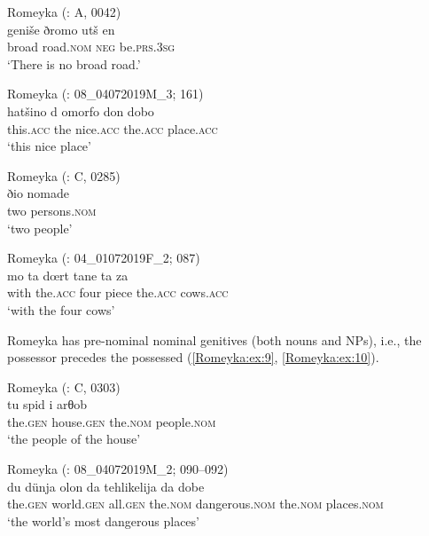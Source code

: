 \documentclass[output=paper,colorlinks,citecolor=brown]{langscibook}
\begin{document}
\ea\label{Romeyka:ex:5}
Romeyka (\citealt{schreiber2021pontic}: A, 0042) \\
\gll geniše ðromo utš en \\
broad road\textsc{.nom} \textsc{neg} be\textsc{.prs.3sg} \\
\glt `There is no broad road.'
\z

\ea\label{Romeyka:ex:6}
Romeyka (\citealt{schreiber_inprep}: 08\_04072019M\_3; 161) \\
\gll hatšino d omorfo don dobo \\
this\textsc{.acc} the nice\textsc{.acc} the\textsc{.acc} place\textsc{.acc} \\
\glt `this nice place'  \\
\z

\ea\label{Romeyka:ex:7}
Romeyka (\citealt{schreiber2021pontic}: C, 0285) \\
\gll ðio nomade  \\
two persons\textsc{.nom} \\
\glt `two people'  \\
\z

\ea\label{Romeyka:ex:8}
Romeyka (\citealt{schreiber_inprep}: 04\_01072019F\_2; 087) \\
\gll mo ta dœrt tane ta za \\
with the\textsc{.acc} four piece the\textsc{.acc} cows\textsc{.acc} \\
\glt `with the four cows'  \\
\z

Romeyka has pre-nominal nominal genitives (both nouns and NPs), i.e., the possessor precedes the possessed (\ref{Romeyka:ex:9}, \ref{Romeyka:ex:10}).

\ea\label{Romeyka:ex:9}
Romeyka (\citealt{schreiber2021pontic}: C, 0303) \\
\gll tu spid i arθob \\
the\textsc{.gen} house\textsc{.gen} the\textsc{.nom} people\textsc{.nom} \\
\glt `the people of the house'  \\
\z

\ea\label{Romeyka:ex:10}
Romeyka (\citealt{schreiber_inprep}: 08\_04072019M\_2; 090--092) \\
\gll du dünja olon da tehlikelija da dobe  \\
the\textsc{.gen} world\textsc{.gen} all\textsc{.gen} the\textsc{.nom} dangerous\textsc{.nom} the\textsc{.nom} places\textsc{.nom} \\
\glt `the world's most dangerous places'  \\
\z
\end{document}
